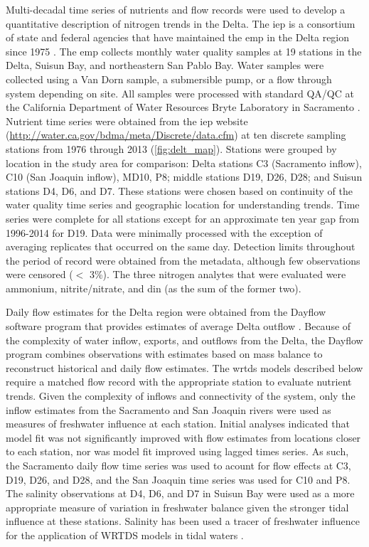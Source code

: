 \documentclass[journal = esthag, manuscript = article]{achemso}\usepackage[]{graphicx}\usepackage[]{color}
\begin{document}
Multi-decadal time series of nutrients and flow records were used to develop a quantitative description of nitrogen trends in the Delta.  The \ac{iep} is a consortium of state and federal agencies that have maintained the \ac{emp} in the Delta region since 1975 \cite{IEP13}.  The \ac{emp} collects monthly water quality samples at 19 stations in the Delta, Suisun Bay, and northeastern San Pablo Bay.  Water samples were collected using a Van Dorn sample, a submersible pump, or a flow through system depending on site.  All samples were processed with standard QA/QC at the California Department of Water Resources Bryte Laboratory in Sacramento \cite{IEP13}.  Nutrient time series were obtained from the \ac{iep} website (\url{http://water.ca.gov/bdma/meta/Discrete/data.cfm}) at ten discrete sampling stations from 1976 through 2013 (\cref{fig:delt_map}).  Stations were grouped by location in the study area for comparison: Delta stations C3 (Sacramento inflow), C10 (San Joaquin inflow), MD10, P8; middle stations D19, D26, D28; and Suisun stations D4, D6, and D7.  These stations were chosen based on continuity of the water quality time series and geographic location for understanding trends.  Time series were complete for all stations except for an approximate ten year gap from 1996-2014 for D19.  Data were minimally processed with the exception of averaging replicates that occurred on the same day.  Detection limits throughout the period of record were obtained from the metadata, although few observations were censored ($<$ 3\%).  The three nitrogen analytes that were evaluated were ammonium, nitrite/nitrate, and \ac{din} (as the sum of the former two).  

Daily flow estimates for the Delta region were obtained from the Dayflow software program that provides estimates of average Delta outflow \cite{IEP16}.  Because of the complexity of water inflow, exports, and outflows from the Delta, the Dayflow program combines observations with estimates based on mass balance to reconstruct historical and daily flow estimates.  The \ac{wrtds} models described below require a matched flow record with the appropriate station to evaluate nutrient trends. Given the complexity of inflows and connectivity of the system, only the inflow estimates from the Sacramento and San Joaquin rivers were used as measures of freshwater influence at each station.  Initial analyses indicated that model fit was not significantly improved with flow estimates from locations closer to each station, nor was model fit improved using lagged times series.  As such, the Sacramento daily flow time series was used to acount for flow effects at C3, D19, D26, and D28, and the San Joaquin time series was used for C10 and P8.  The salinity observations at D4, D6, and D7 in Suisun Bay were used as a more appropriate measure of variation in freshwater balance given the stronger tidal influence at these stations.  Salinity has been used a tracer of freshwater influence for the application of WRTDS models in tidal waters \cite{Beck15}.  
\end{document}
